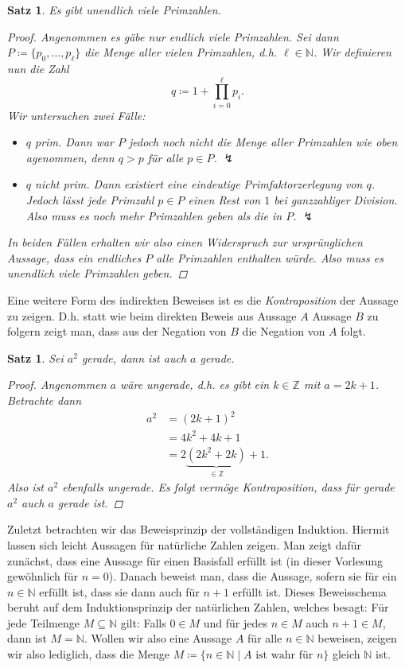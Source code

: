 \documentclass[11pt, a4paper]{article}
\theoremstyle{definition}
\theoremstyle{plain}
\newtheorem{theorem}[definition]{Satz}
\numberwithin{equation}{section}
\begin{document}
\begin{theorem}\label{thm:primes}
	Es gibt unendlich viele Primzahlen.
	\begin{proof}
		Angenommen es gäbe nur endlich viele Primzahlen. Sei dann $P \coloneqq \{p_0, \ldots, p_\ell\}$ die Menge aller vielen Primzahlen, d.h. $\ell \in \mathbb{N}$. Wir definieren nun die Zahl 
		$$
			q \coloneqq 1 + \prod_{i=0}^\ell p_i.
		$$
		Wir untersuchen zwei Fälle:
		\begin{itemize}
			\item $q$ prim. Dann war $P$ jedoch noch nicht die Menge aller Primzahlen wie oben agenommen, denn $q > p$ für alle $p \in P$. $\lightning$
			\item $q$ nicht prim. Dann existiert eine eindeutige Primfaktorzerlegung von $q$. Jedoch lässt jede Primzahl $p \in P$ einen Rest von $1$ bei ganzzahliger Division. Also muss es noch mehr Primzahlen geben als die in $P$. $\lightning$
		\end{itemize}
		In beiden Fällen erhalten wir also einen Widerspruch zur ursprünglichen Aussage, dass ein endliches $P$ alle Primzahlen enthalten würde. Also muss es unendlich viele Primzahlen geben.
	\end{proof}
\end{theorem}
Eine weitere Form des indirekten Beweises ist es die \textit{Kontraposition} der Aussage zu zeigen. D.h. statt wie beim direkten Beweis aus Aussage $A$ Aussage $B$ zu folgern zeigt man, dass aus der Negation von $B$ die Negation von $A$ folgt.
\begin{theorem}
	Sei $a^2$ gerade, dann ist auch $a$ gerade.
	\begin{proof}
		Angenommen $a$ wäre ungerade, d.h. es gibt ein $k \in \mathbb{Z}$ mit $a = 2k + 1$. Betrachte dann
		\begin{align*}
			a^2 &= (2k + 1)^2\\
			&= 4k^2 + 4k + 1\\
			&= 2\underbrace{(2k^2 + 2k)}_{\in \mathbb{Z}} + 1.
		\end{align*}
		Also ist $a^2$ ebenfalls ungerade. Es folgt vermöge Kontraposition, dass für gerade $a^2$ auch $a$ gerade ist.
	\end{proof}
\end{theorem}
Zuletzt betrachten wir das Beweisprinzip der vollständigen Induktion. Hiermit lassen sich leicht Aussagen für natürliche Zahlen zeigen. Man zeigt dafür zunächst, dass eine Aussage für einen Basisfall erfüllt ist (in dieser Vorlesung gewöhnlich für $n = 0$). Danach beweist man, dass die Aussage, sofern sie für ein $n \in \mathbb{N}$ erfüllt ist, dass sie dann auch für $n+1$ erfüllt ist. Dieses Beweisschema beruht auf dem Induktionsprinzip der natürlichen Zahlen, welches besagt: Für jede Teilmenge $M \subseteq \mathbb{N}$ gilt: Falls $0 \in M$ und für jedes $n \in M$ auch $n+1 \in M$, dann ist $M = \mathbb{N}$. Wollen wir also eine Aussage $A$ für alle $n \in \mathbb{N}$ beweisen, zeigen wir also lediglich, dass die Menge $M \coloneqq \{n \in \mathbb{N} \mid A \text{ ist wahr für } n\}$ gleich $\mathbb{N}$ ist.
\end{document}
